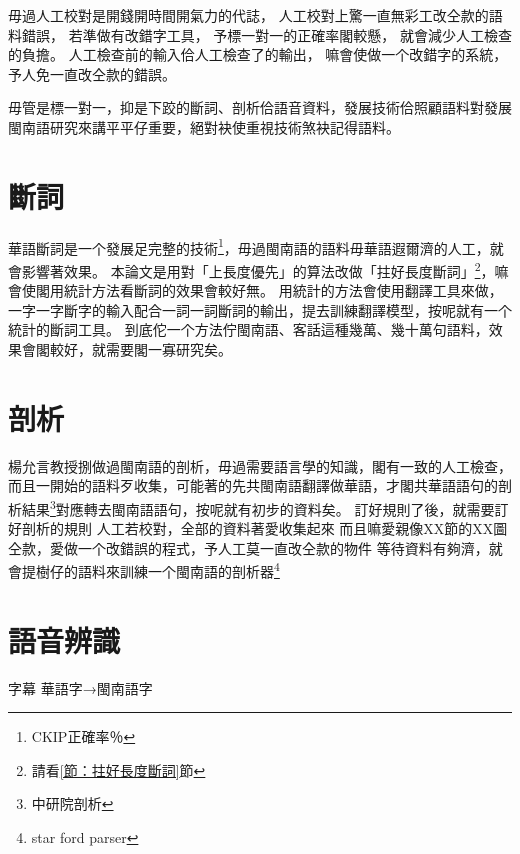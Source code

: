 
毋過人工校對是開錢開時間開氣力的代誌，
人工校對上驚一直無彩工改仝款的語料錯誤，
若準做有改錯字工具，
予標一對一的正確率閣較懸，
就會減少人工檢查的負擔。
人工檢查前的輸入佮人工檢查了的輸出，
嘛會使做一个改錯字的系統，
予人免一直改仝款的錯誤。

毋管是標一對一，抑是下跤的斷詞、剖析佮語音資料，發展技術佮照顧語料對發展閩南語研究來講平平仔重要，絕對袂使重視技術煞袂記得語料。

\section{斷詞}
\label{節：未來斷詞}
華語斷詞是一个發展足完整的技術\footnote{CKIP正確率％}，毋過閩南語的語料毋華語遐爾濟的人工，就會影響著效果。
本論文是用對「上長度優先」的算法改做「拄好長度斷詞」\footnote{請看\ref{節：拄好長度斷詞}節}，嘛會使閣用統計方法看斷詞的效果會較好無。
用統計的方法會使用翻譯工具來做，一字一字斷字的輸入配合一詞一詞斷詞的輸出，提去訓練翻譯模型，按呢就有一个統計的斷詞工具。
到底佗一个方法佇閩南語、客話這種幾萬、幾十萬句語料，效果會閣較好，就需要閣一寡研究矣。
\section{剖析}
\label{節：未來剖析}
楊允言教授捌做過閩南語的剖析，毋過需要語言學的知識，閣有一致的人工檢查，而且一開始的語料歹收集，可能著的先共閩南語翻譯做華語，才閣共華語語句的剖析結果\footnote{中研院剖析}對應轉去閩南語語句，按呢就有初步的資料矣。
訂好規則了後，就需要訂好剖析的規則
人工若校對，全部的資料著愛收集起來
而且嘛愛親像XX節的XX圖仝款，愛做一个改錯誤的程式，予人工莫一直改仝款的物件
等待資料有夠濟，就會提樹仔的語料來訓練一个閩南語的剖析器\footnote{star ford parser}


\section{語音辨識}
\label{節：未來辨識}
字幕 華語字→閩南語字